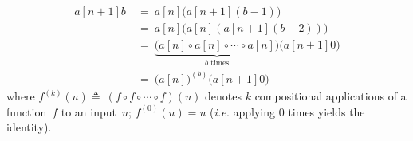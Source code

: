 \begin{equation*}
\begin{array}{lll}
a[n+1]b ~& = ~ a[n]\big(a[n+1](b-1)\big) \\
         & = ~ a[n]\big(a[n](a[n+1](b-2))\big) \\
         & = ~ \underbrace{\big( a[n]\circ a[n]\circ \cdots \circ a[n] \big)}_{b \text{ times}} \big(a[n+1]0\big) \\
         & = ~ \big(a[n]\big)^{(b)}\big(a[n+1]0\big)
\end{array}
\end{equation*}
where $f^{(k)}(u) \triangleq ~ (f\circ f\circ \cdots \circ f)(u)$ denotes $k$ compositional applications of a function~$f$ to an
input~$u$; $f^{(0)}(u) = u$ (\emph{i.e.} applying $0$ times yields the identity).

